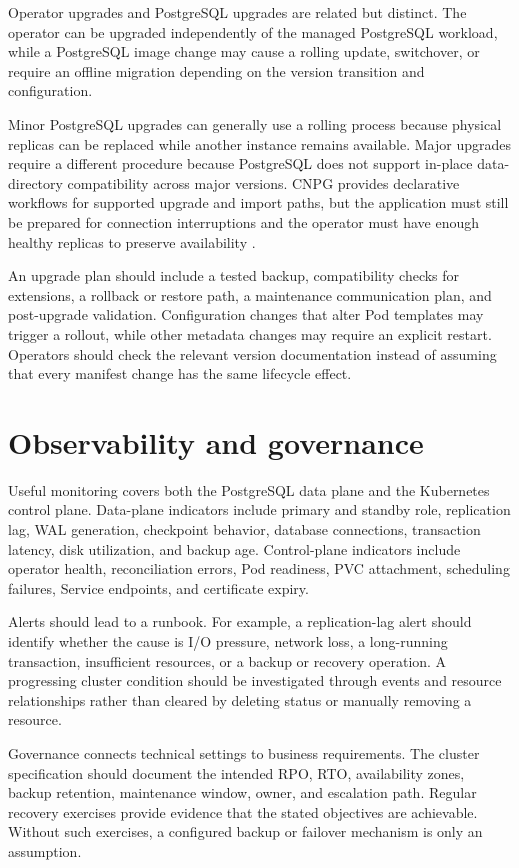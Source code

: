 \documentclass[11pt,a4paper]{article}
\begin{document}
Operator upgrades and PostgreSQL upgrades are related but distinct. The operator can be upgraded independently of the managed PostgreSQL workload, while a PostgreSQL image change may cause a rolling update, switchover, or require an offline migration depending on the version transition and configuration.

Minor PostgreSQL upgrades can generally use a rolling process because physical replicas can be replaced while another instance remains available. Major upgrades require a different procedure because PostgreSQL does not support in-place data-directory compatibility across major versions. CNPG provides declarative workflows for supported upgrade and import paths, but the application must still be prepared for connection interruptions and the operator must have enough healthy replicas to preserve availability \cite{cnpg-upgrades}.

An upgrade plan should include a tested backup, compatibility checks for extensions, a rollback or restore path, a maintenance communication plan, and post-upgrade validation. Configuration changes that alter Pod templates may trigger a rollout, while other metadata changes may require an explicit restart. Operators should check the relevant version documentation instead of assuming that every manifest change has the same lifecycle effect.

\section{Observability and governance}

Useful monitoring covers both the PostgreSQL data plane and the Kubernetes control plane. Data-plane indicators include primary and standby role, replication lag, WAL generation, checkpoint behavior, database connections, transaction latency, disk utilization, and backup age. Control-plane indicators include operator health, reconciliation errors, Pod readiness, PVC attachment, scheduling failures, Service endpoints, and certificate expiry.

Alerts should lead to a runbook. For example, a replication-lag alert should identify whether the cause is I/O pressure, network loss, a long-running transaction, insufficient resources, or a backup or recovery operation. A progressing cluster condition should be investigated through events and resource relationships rather than cleared by deleting status or manually removing a resource.

Governance connects technical settings to business requirements. The cluster specification should document the intended RPO, RTO, availability zones, backup retention, maintenance window, owner, and escalation path. Regular recovery exercises provide evidence that the stated objectives are achievable. Without such exercises, a configured backup or failover mechanism is only an assumption.
\end{document}
